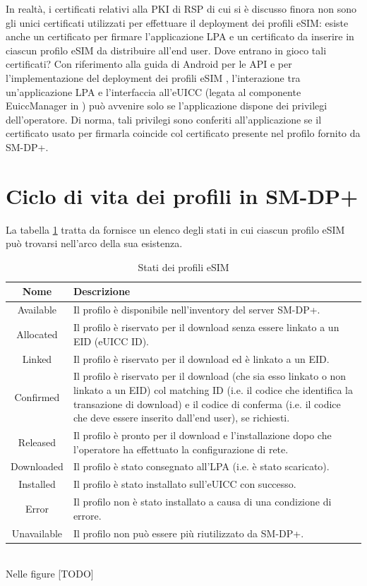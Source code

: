 \documentclass[10pt, twoside, openany]{book}
\begin{document}
In realtà, i certificati relativi alla PKI di RSP di cui si è discusso finora non sono gli unici certificati utilizzati per effettuare il deployment dei profili eSIM: esiste anche un certificato per firmare l'applicazione LPA e un certificato da inserire in ciascun profilo eSIM da distribuire all'end user. Dove entrano in gioco tali certificati? Con riferimento alla guida di Android per le API e per l'implementazione del deployment dei profili eSIM \cite{Android-docs}, l'interazione tra un'applicazione LPA e l'interfaccia all'eUICC (legata al componente EuiccManager in \cite{Android-docs}) può avvenire solo se l'applicazione dispone dei privilegi dell'operatore. Di norma, tali privilegi sono conferiti all'applicazione se il certificato usato per firmarla coincide col certificato presente nel profilo fornito da SM-DP+.

\section{Ciclo di vita dei profili in SM-DP+}
La tabella \ref{tab:profile-states} tratta da \cite{GSMA-docs} fornisce un elenco degli stati in cui ciascun profilo eSIM può trovarsi nell'arco della sua esistenza.
\begin{table}[h!]
\begin{center}
\captionsetup{skip=4pt}
\caption{Stati dei profili eSIM}
\label{tab:profile-states}
\begin{tabularx}{\textwidth}{|c|X|}
\hline
\textbf{Nome} & \textbf{Descrizione}\\
\hline
Available & Il profilo è disponibile nell’inventory del server SM-DP+.\\
\hline
Allocated & Il profilo è riservato per il download senza essere linkato a un EID (eUICC ID).\\
\hline
Linked & Il profilo è riservato per il download ed è linkato a un EID.\\
\hline
Confirmed & Il profilo è riservato per il download (che sia esso linkato o non linkato a un EID) col matching ID (i.e. il codice che identifica la transazione di download) e il codice di conferma (i.e. il codice che deve essere inserito dall'end user), se richiesti.\\
\hline
Released & Il profilo è pronto per il download e l’installazione dopo che l’operatore ha effettuato la configurazione di rete.\\
\hline
Downloaded & Il profilo è stato consegnato all’LPA (i.e. è stato scaricato).\\
\hline
Installed & Il profilo è stato installato sull’eUICC con successo.\\
\hline
Error & Il profilo non è stato installato a causa di una condizione di errore.\\
\hline
Unavailable & Il profilo non può essere più riutilizzato da SM-DP+.\\
\hline
\end{tabularx}
\end{center}
\end{table}
\\Nelle figure [TODO]
\end{document}
